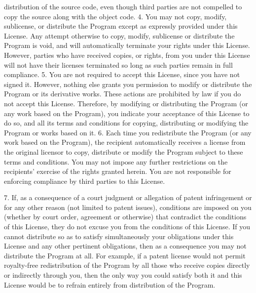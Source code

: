 \begin{DoxyCodeInclude}
\textcolor{stringliteral}{distribution of the source code, even though third parties are not}
\textcolor{stringliteral}{compelled to copy the source along with the object code.}
\textcolor{stringliteral}{}
\textcolor{stringliteral}{  4. You may not copy, modify, sublicense, or distribute the Program}
\textcolor{stringliteral}{except as expressly provided under this License.  Any attempt}
\textcolor{stringliteral}{otherwise to copy, modify, sublicense or distribute the Program is}
\textcolor{stringliteral}{void, and will automatically terminate your rights under this License.}
\textcolor{stringliteral}{However, parties who have received copies, or rights, from you under}
\textcolor{stringliteral}{this License will not have their licenses terminated so long as such}
\textcolor{stringliteral}{parties remain in full compliance.}
\textcolor{stringliteral}{}
\textcolor{stringliteral}{  5. You are not required to accept this License, since you have not}
\textcolor{stringliteral}{signed it.  However, nothing else grants you permission to modify or}
\textcolor{stringliteral}{distribute the Program or its derivative works.  These actions are}
\textcolor{stringliteral}{prohibited by law if you do not accept this License.  Therefore, by}
\textcolor{stringliteral}{modifying or distributing the Program (or any work based on the}
\textcolor{stringliteral}{Program), you indicate your acceptance of this License to do so, and}
\textcolor{stringliteral}{all its terms and conditions for copying, distributing or modifying}
\textcolor{stringliteral}{the Program or works based on it.}
\textcolor{stringliteral}{}
\textcolor{stringliteral}{  6. Each time you redistribute the Program (or any work based on the}
\textcolor{stringliteral}{Program), the recipient automatically receives a license from the}
\textcolor{stringliteral}{original licensor to copy, distribute or modify the Program subject to}
\textcolor{stringliteral}{these terms and conditions.  You may not impose any further}
\textcolor{stringliteral}{restrictions on the recipients'} exercise of the rights granted herein.
You are not responsible \textcolor{keywordflow}{for} enforcing compliance by third parties to
\textcolor{keyword}{this} License.

  7. If, as a consequence of a court judgment or allegation of patent
infringement or \textcolor{keywordflow}{for} any other reason (not limited to patent issues),
conditions are imposed on you (whether by court order, agreement or
otherwise) that contradict the conditions of \textcolor{keyword}{this} License, they \textcolor{keywordflow}{do} not
excuse you from the conditions of \textcolor{keyword}{this} License.  If you cannot
distribute so as to satisfy simultaneously your obligations under \textcolor{keyword}{this}
License and any other pertinent obligations, then as a consequence you
may not distribute the Program at all.  For example, \textcolor{keywordflow}{if} a patent
license would not permit royalty-free redistribution of the Program by
all those who receive copies directly or indirectly through you, then
the only way you could satisfy both it and \textcolor{keyword}{this} License would be to
refrain entirely from distribution of the Program.


\end{DoxyCodeInclude}
